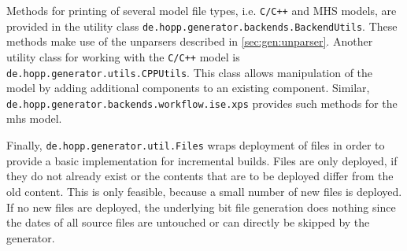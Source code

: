 \documentclass{report}
\begin{document}
Methods for printing of several model file types, i.e. \texttt{C/C++} and MHS models, are provided in the utility class \texttt{de.hopp.generator.backends.BackendUtils}. These methods make use of the unparsers described in \ref{sec:gen:unparser}.
Another utility class for working with the \texttt{C/C++} model is \texttt{de.hopp.generator.utils.CPPUtils}. This class allows manipulation of the model by adding additional components to an existing component.
Similar, \texttt{de.hopp.generator.backends.workflow.ise.xps} provides such methods for the mhs model.

Finally, \texttt{de.hopp.generator.util.Files} wraps deployment of files in order to provide a basic implementation for incremental builds. Files are only deployed, if they do not already exist or the contents that are to be deployed differ from the old content. This is only feasible, because a small number of new files is deployed. If no new files are deployed, the underlying bit file generation does nothing since the dates of all source files are untouched or can directly be skipped by the generator.


\newpage
\pagestyle{empty}


\end{document}
